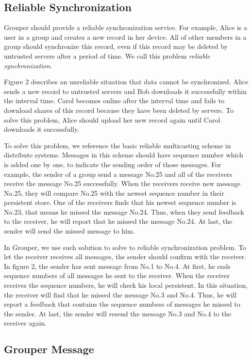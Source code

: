 \documentclass[twocolumn,10pt]{article}
\begin{document}
\subsection{Reliable Synchronization}
Grouper should provide a reliable synchronization service. For example, Alice is a user in a group and creates a new record in her device. All of other members in a group should synchronize this record, even if this record may be deleted by untrusted servers after a period of time. We call this problem \emph{reliable synchronization}.

Figure 2 describes an unreliable situation that data cannot be synchronized. Alice sends a new record to untrusted servers and Bob downloads it successfully within the interval time. Carol becomes online after the interval time and fails to download shares of this record because they have been deleted by servers. To solve this problem, Alice should upload her new record again until Carol downloads it successfully.

To solve this problem, we reference the basic reliable multicasting scheme in distribute systems. Messages in this scheme should have sequence number which is added one by one, to indicate the sending order of those messages. For example, the sender of a group send a message No.25 and all of the receivers receive the message No.25 successfully. When the receivers receive new message No.25, they will compare No.25 with the newest sequence number in their persistent store. One of the receivers finds that his newest sequence number is No.23, that means he missed the message No.24. Thus, when they send feedback to the receiver, he will report that he missed the message No.24. At last, the sender will send the missed message to him.

In Grouper, we use such solution to solve to reliable synchronization problem. To let the receiver receives all messages, the sender should confirm with the receiver. In figure 2, the sender has sent message from No.1 to No.4. At first, he ends sequence numbers of all messages he sent to the receiver. When the receiver receives the sequence numbers, he will check his local persistent. In this situation, the receiver will find that he missed the message No.3 and No.4. Thus, he will report a feedback that contains the sequence numbers of messages he missed to the sender. At last, the sender will resend the message No.3 and No.4 to the receiver again.

\subsection{Grouper Message}
\end{document}
